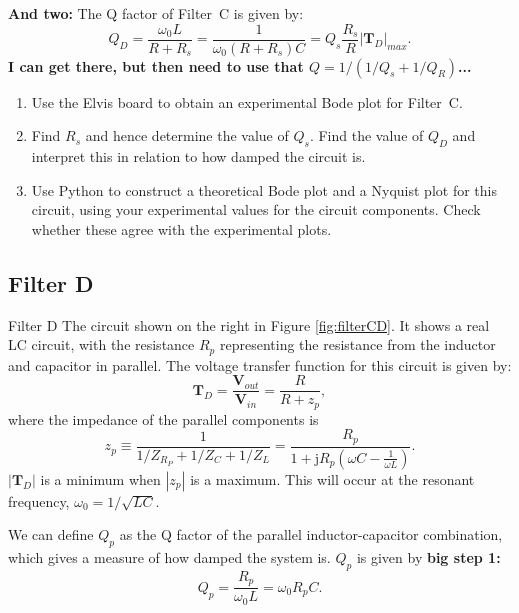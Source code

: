\documentclass{article}
\begin{document}
{\bf And two:}
The Q factor of Filter~C is given by:
\begin{equation}
  Q_D=\frac{\omega_0 L}{R + R_s}=\frac{1}{\omega_0(R+R_s)C}=
  Q_s\frac{R_s}{R}|\mathbf{T}_{D}|_{max}.
\end{equation}
{\bf I can get there, but then need to use that $Q = 1/(1/Q_s + 1/Q_R)$...}

\begin{enumerate}
\item Use the Elvis board to obtain an experimental Bode plot for Filter~C.
  
\item Find $R_s$ and hence determine the value of $Q_s$. Find the
  value of $Q_D$ and interpret this in relation to how damped the
  circuit is.
  
\item Use Python to construct a theoretical Bode plot and a
  Nyquist plot for this circuit, using your experimental values for
  the circuit components. Check whether these agree with the
  experimental plots.
\end{enumerate}

\subsection*{Filter D}
Filter D The circuit shown on the right in Figure
\ref{fig:filterCD}. It shows a real LC circuit, with the resistance
$R_p$ representing the resistance from the inductor and capacitor in
parallel. The voltage transfer function for this circuit is given by:
\begin{equation}
  \mathbf{T}_D=\frac{\mathbf{V}_{out}}{\mathbf{V}_{in}}=\frac{R}{R+z_p},
\end{equation}
where the impedance of the parallel components is 
\begin{equation}
  z_p\equiv \frac{1}{1/Z_{R_P}+1/Z_C+1/Z_L}=\frac{R_p}{1+\mathrm{j}R_p\left(\omega C - \frac{1}{\omega L}\right)}.
\end{equation}
$|\mathbf{T}_D|$ is a minimum when $|z_p|$ is a
maximum. This will occur at the resonant
frequency, %
$\omega_0=1/\sqrt{LC}$.

We can define $Q_p$ as the Q factor of the parallel inductor-capacitor
combination, which gives a measure of how damped the system is. $Q_p$
is given by {\bf big step 1:}
\begin{equation}
  Q_p=\frac{R_p}{\omega_0 L}=\omega_0 R_p C.
\end{equation}
\end{document}
